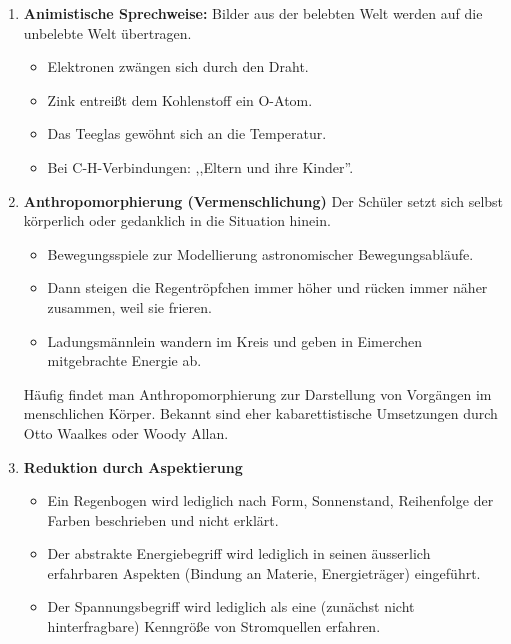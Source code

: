 \begin{enumerate}
	\item \textbf{Animistische Sprechweise:} Bilder aus der belebten
	Welt werden auf die unbelebte Welt \"{u}bertragen.
	
	\mip
	\begin{beisp2}
	\begin{itemize}
		\item Elektronen zw\"{a}ngen sich durch den Draht.
		\item Zink entrei{\ss}t dem Kohlenstoff ein O-Atom.
		\item Das Tee\-glas gew\"{o}hnt sich an die Temperatur.
		\item Bei C-H-Verbindungen: ,,Eltern und ihre Kinder''.
	\end{itemize}
	\end{beisp2}
	
	\item \textbf{Anthropomorphierung (Vermenschlichung)}
	Der Sch\"{u}ler setzt sich selbst k\"{o}rperlich oder gedanklich in die
	Situation hinein.
	
	\begin{beisp2}
	\begin{itemize}
		\item Bewegungsspiele zur Modellierung
		astronomischer Bewegungsabl\"{a}ufe.
		\item Dann steigen die Regentr\"{o}pfchen immer h\"{o}her und r\"{u}cken immer
		n\"{a}her zusammen, weil sie frieren.
		\item Ladungsm\"{a}nnlein wandern im Kreis und geben in Eimerchen
		mitgebrachte Energie ab.
	\end{itemize}
	\end{beisp2}
	
	H\"{a}ufig findet man Anthropomorphierung zur Darstellung von
	Vorg\"{a}ngen im menschlichen K\"{o}rper.
	Bekannt sind eher kabarettistische Umsetzungen durch Otto Waalkes oder Woody Allan.
	
	\item \textbf{Reduktion durch Aspektierung}
	
	\begin{beisp2}
	\begin{itemize}
		\item  Ein Regenbogen wird lediglich nach Form,
		Sonnenstand, Reihenfolge der Farben beschrieben und nicht
		erkl\"{a}rt.
		\item Der abstrakte Energiebegriff wird lediglich in
		seinen \"{a}usserlich erfahrbaren Aspekten (Bindung an Materie, Energietr\"{a}ger)
		eingef\"{u}hrt.
		\item Der Spannungsbegriff wird lediglich als eine
		(zun\"{a}chst nicht hinterfragbare) Kenngr\"{o}{\ss}e von
		Stromquellen erfahren.
	\end{itemize}
	\end{beisp2}
	

\end{enumerate}
